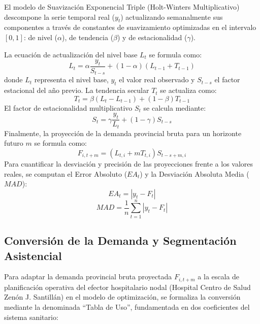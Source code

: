 \documentclass[conference]{IEEEtran}
\begin{document}
El modelo de Suavización Exponencial Triple (Holt-Winters Multiplicativo) descompone la serie temporal real ($y_t$) actualizando semanalmente sus componentes a través de constantes de suavizamiento optimizadas en el intervalo $[0,1]$: de nivel ($\alpha$), de tendencia ($\beta$) y de estacionalidad ($\gamma$).

La ecuación de actualización del nivel base $L_t$ se formula como:
\begin{equation}
    L_t = \alpha \frac{y_t}{S_{t-s}} + (1 - \alpha) (L_{t-1} + T_{t-1})
\end{equation}
donde $L_t$ representa el nivel base, $y_t$ el valor real observado y $S_{t-s}$ el factor estacional del año previo. La tendencia secular $T_t$ se actualiza como:
\begin{equation}
    T_t = \beta (L_t - L_{t-1}) + (1 - \beta) T_{t-1}
\end{equation}
El factor de estacionalidad multiplicativo $S_t$ se calcula mediante:
\begin{equation}
    S_t = \gamma \frac{y_t}{L_t} + (1 - \gamma) S_{t-s}
\end{equation}
Finalmente, la proyección de la demanda provincial bruta para un horizonte futuro $m$ se formula como:
\begin{equation}
    F_{i,t+m} = (L_{t,i} + m T_{t,i}) S_{t-s+m,i}
\end{equation}
Para cuantificar la desviación y precisión de las proyecciones frente a los valores reales, se computan el Error Absoluto ($EA_t$) y la Desviación Absoluta Media ($MAD$):
\begin{equation}
    EA_t = |y_t - F_t|
\end{equation}
\begin{equation}
    MAD = \frac{1}{n} \sum_{t=1}^{n} |y_t - F_t|
\end{equation}

\subsection{Conversión de la Demanda y Segmentación Asistencial}
Para adaptar la demanda provincial bruta proyectada $F_{i,t+m}$ a la escala de planificación operativa del efector hospitalario nodal (Hospital Centro de Salud Zenón J. Santillán) en el modelo de optimización, se formaliza la conversión mediante la denominada ``Tabla de Uso'', fundamentada en dos coeficientes del sistema sanitario:
\end{document}
